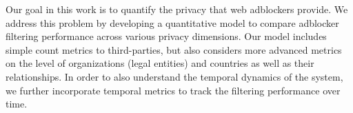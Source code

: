\documentclass[compsoc, conference, letterpaper, 10pt, times]{IEEEtran}
\begin{document}

















Our goal in this work is to quantify the privacy that web adblockers provide. We address this problem by developing a quantitative model to compare adblocker filtering performance across various privacy dimensions. Our model includes simple count metrics to third-parties, but also considers more advanced metrics on the level of organizations (legal entities) and countries as well as their relationships. In order to also understand the temporal dynamics of the system, we further incorporate temporal metrics to track the filtering performance over time. 

\end{document}
